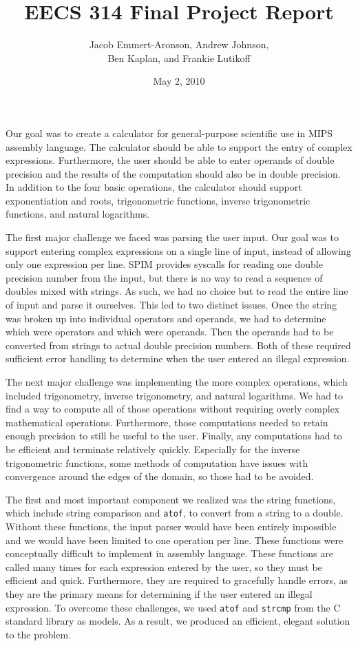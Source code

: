 \documentclass[10pt,letterpaper]{article}
\title{EECS 314 Final Project Report}
\author{Jacob Emmert-Aronson, Andrew Johnson,\\Ben Kaplan, and Frankie Lutikoff}
\date{May 2, 2010}
\begin{document}
\maketitle

Our goal was to create a calculator for general-purpose scientific use in MIPS
assembly language. The calculator should be able to support the entry of complex
expressions. Furthermore, the user should be able to enter operands of double
precision and the results of the computation should also be in double precision.
In addition to the four basic operations, the calculator should support
exponentiation and roots, trigonometric functions, inverse trigonometric
functions, and natural logarithms.

The first major challenge we faced was parsing the user input. Our goal was to
support entering complex expressions on a single line of input, instead of
allowing only one expression per line. SPIM provides syscalls for reading one
double precision number from the input, but there is no way to read a sequence
of doubles mixed with strings. As such, we had no choice but to read the entire
line of input and parse it ourselves. This led to two distinct issues. Once the
string was broken up into individual operators and operands, we had to determine
which were operators and which were operands. Then the operands had to be
converted from strings to actual double precision numbers. Both of these
required sufficient error handling to determine when the user entered an illegal
expression.

The next major challenge was implementing the more complex operations, which
included trigonometry, inverse trigonometry, and natural logarithms. We had to
find a way to compute all of those operations without requiring overly complex
mathematical operations. Furthermore, those computations needed to retain enough
precision to still be useful to the user. Finally, any computations had to be
efficient and terminate relatively quickly. Especially for the inverse
trigonometric functions, some methods of computation have issues with
convergence around the edges of the domain, so those had to be avoided.

The first and most important component we realized was the string functions,
which include string comparison and \texttt{atof}, to convert from a string to a
double. Without these functions, the input parser would have been entirely
impossible and we would have been limited to one operation per line. These
functions were conceptually difficult to implement in assembly language. These
functions are called many times for each expression entered by the user, so they
must be efficient and quick. Furthermore, they are required to gracefully handle
errors, as they are the primary means for determining if the user entered an
illegal expression. To overcome these challenges, we used \texttt{atof} and
\texttt{strcmp} from the C standard library as models. As a result, we produced
an efficient, elegant solution to the problem.
\end{document}
